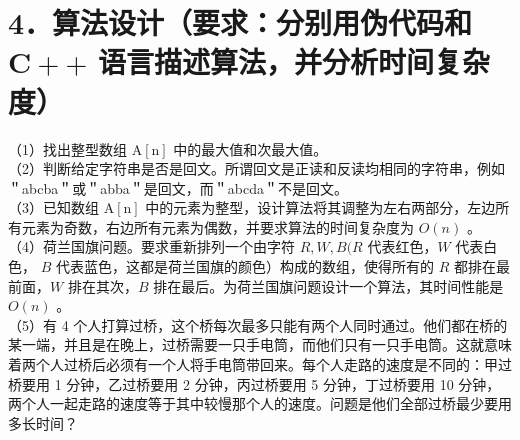 \documentclass[10pt]{article}
\begin{document}
\section*{4．算法设计（要求：分别用伪代码和 $\mathbf{C}++$ 语言描述算法，并分析时间复杂度）}
（1）找出整型数组 $\mathrm{A}[\mathrm{n}]$ 中的最大值和次最大值。\\
（2）判断给定字符串是否是回文。所谓回文是正读和反读均相同的字符串，例如 ＂abcba＂或＂abba＂是回文，而＂abcda＂不是回文。\\
（3）已知数组 $\mathrm{A}[\mathrm{n}]$ 中的元素为整型，设计算法将其调整为左右两部分，左边所有元素为奇数，右边所有元素为偶数，并要求算法的时间复杂度为 $O(n)$ 。\\
（4）荷兰国旗问题。要求重新排列一个由字符 $R, W, B(R$ 代表红色，$W$ 代表白色， $B$ 代表蓝色，这都是荷兰国旗的颜色）构成的数组，使得所有的 $R$ 都排在最前面，$W$ 排在其次，$B$ 排在最后。为荷兰国旗问题设计一个算法，其时间性能是 $O(n)$ 。\\
（5）有 4 个人打算过桥，这个桥每次最多只能有两个人同时通过。他们都在桥的某一端，并且是在晚上，过桥需要一只手电筒，而他们只有一只手电筒。这就意味着两个人过桥后必须有一个人将手电筒带回来。每个人走路的速度是不同的：甲过桥要用 1 分钟，乙过桥要用 2 分钟，丙过桥要用 5 分钟，丁过桥要用 10 分钟，两个人一起走路的速度等于其中较慢那个人的速度。问题是他们全部过桥最少要用多长时间？
\end{document}
